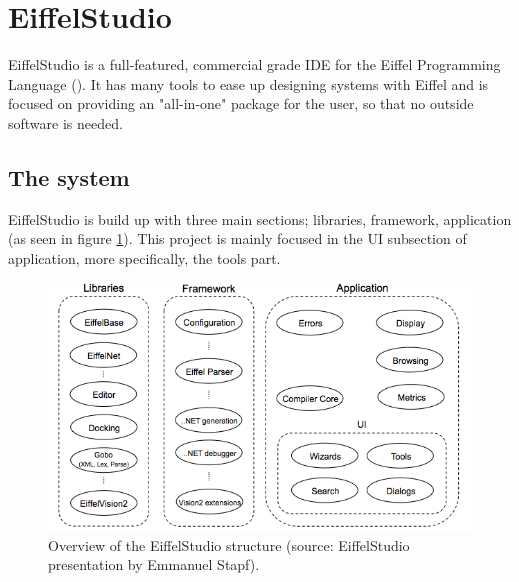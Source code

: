 \section{EiffelStudio}
EiffelStudio is a full-featured, commercial grade IDE for the Eiffel Programming Language (\cite[Quote from Origo website]{eiffel2006}). It has many tools to ease up designing systems with Eiffel and is focused on providing an "all-in-one" package for the user, so that no outside software is needed.

\subsection{The system}
EiffelStudio is build up with three main sections; libraries, framework, application (as seen in figure \ref{fig:eiffelstudio_structure}). This project is mainly focused in the UI subsection of application, more specifically, the tools part.
\begin{figure}[h]
\centerline{
\includegraphics[scale=0.7]{images/eiffelstudio-structure-full.png}
}
\caption[Overview of the EiffelStudio structure]{Overview of the EiffelStudio structure (source: EiffelStudio presentation by Emmanuel Stapf).}
\label{fig:eiffelstudio_structure}
\end{figure}
